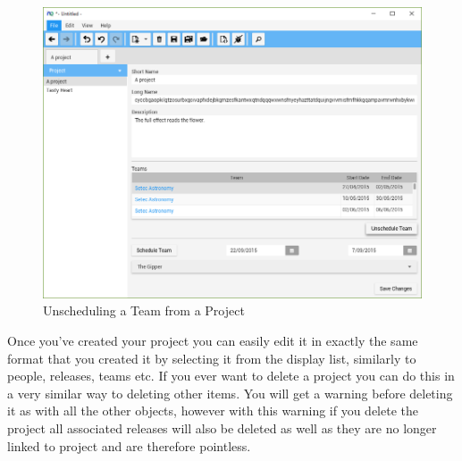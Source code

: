\begin{figure}[H]
\centering
\includegraphics[width=\textwidth]{images/screenshots/projects3.PNG}
\caption{Unscheduling a Team from a Project}
\label{fig:new_project}
\end{figure}

Once you've created your project you can easily edit it in exactly the same format that you created it by selecting it from the display list, similarly to people, releases, teams etc. If you ever want to delete a project you can do this in a very similar way to deleting other items. You will get a warning before deleting it as with all the other objects, however with this warning if you delete the project all associated releases will also be deleted as well as they are no longer linked to project and are therefore pointless.